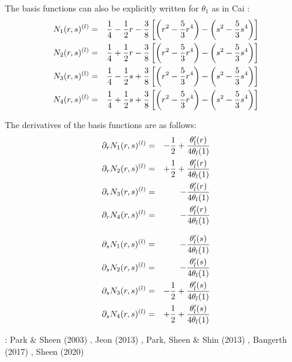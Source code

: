 The basis functions can also be explicitly written for $\theta_1$ as in Cai \etal \cite{cady99}:
\begin{eqnarray}
N_1(r,s)^{(l)} 
&=& \frac{1}{4} - \frac{1}{2} r - \frac38 \left[\left( r^2-\frac53r^4 \right) - \left(s^2-\frac53s^4 \right) \right] \nonumber\\
N_2(r,s)^{(l)} 
&=& \frac{1}{4} + \frac{1}{2} r - \frac38 \left[\left( r^2-\frac53r^4 \right) - \left(s^2-\frac53s^4 \right) \right] \nonumber\\
N_3(r,s)^{(l)} 
&=& \frac{1}{4} - \frac{1}{2} s + \frac38 \left[\left( r^2-\frac53r^4 \right) - \left(s^2-\frac53s^4 \right) \right] \nonumber\\
N_4(r,s)^{(l)} 
&=& \frac{1}{4} + \frac{1}{2} s + \frac38 \left[\left( r^2-\frac53r^4 \right) - \left(s^2-\frac53s^4 \right) \right] 
\end{eqnarray}

The derivatives of the basis functions are as follows:
\begin{eqnarray}
\partial_r N_1(r,s)^{(l)} &=&  - \frac{1}{2}  + \frac{\theta_l'(r)}{4 \theta_l(1)}  \nonumber\\
\partial_r N_2(r,s)^{(l)} &=&  + \frac{1}{2}  + \frac{\theta_l'(r)}{4 \theta_l(1)}  \nonumber\\
\partial_r N_3(r,s)^{(l)} &=&  - \frac{\theta_l'(r)}{4 \theta_l(1)}  \nonumber\\
\partial_r N_4(r,s)^{(l)} &=&  - \frac{\theta_l'(r)}{4 \theta_l(1)}  
\end{eqnarray}

\begin{eqnarray}
\partial_s N_1(r,s)^{(l)} &=&   -\frac{\theta_l'(s)}{4 \theta_l(1)}  \nonumber\\
\partial_s N_2(r,s)^{(l)} &=&   -\frac{\theta_l'(s)}{4 \theta_l(1)}  \nonumber\\
\partial_s N_3(r,s)^{(l)} &=&   - \frac{1}{2} + \frac{\theta_l'(s)}{4 \theta_l(1)}  \nonumber\\
\partial_s N_4(r,s)^{(l)} &=&   + \frac{1}{2} + \frac{\theta_l'(s)}{4 \theta_l(1)}  
\end{eqnarray}





\Literature: 
Park \& Sheen (2003) \cite{pash03},
Jeon \etal (2013) \cite{jens13},
Park, Sheen \& Shin (2013) \cite{pass13},
Bangerth \etal (2017) \cite{baks17},
Sheen (2020) \cite{shee20}
